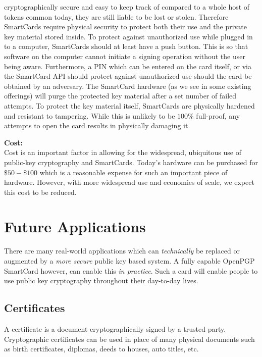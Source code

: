 \documentclass[11pt, twocolumn]{article}
\newenvironment{packed_desc}{
\begin{description}
  \setlength{\itemsep}{1pt}
  \setlength{\parskip}{0pt}
  \setlength{\parsep}{0pt}
}{\end{description}}
\begin{document}
\begin{packed_desc}
  cryptographically secure and easy to keep track of compared to a
  whole host of tokens common today, they are still liable to be lost
  or stolen. Therefore SmartCards require physical security to protect
  both their use and the private key material stored inside. To
  protect against unauthorized use while plugged in to a computer,
  SmartCards should at least have a push button. This is so that
  software on the computer cannot initiate a signing operation without
  the user being aware. Furthermore, a PIN which can be entered on the
  card itself, or via the SmartCard API should protect against
  unauthorized use should the card be obtained by an adversary. The
  SmartCard hardware (as we see in some existing offerings) will purge
  the protected key material after a set number of failed attempts. To
  protect the key material itself, SmartCards are physically hardened
  and resistant to tampering. While this is unlikely to be $100\%$
  full-proof, any attempts to open the card results in physically
  damaging it.
\item{\textbf{Cost:}} \\ \hfill Cost is an important factor in
  allowing for the widespread, ubiquitous use of public-key
  cryptography and SmartCards. Today's hardware can be purchased for
  $\$50 - \$100$ which is a reasonable expense for such an important
  piece of hardware. However, with more widespread use and economies
  of scale, we expect this cost to be reduced.
\end{packed_desc}

\section{Future Applications}
\label{sec:future}

There are many real-world applications which can \textit{technically} be
replaced or augmented by a \textit{more secure} public key based system. A fully
capable OpenPGP SmartCard however, can enable this \textit{in practice}. Such a
card will enable people to use public key cryptography throughout their
day-to-day lives.

\subsection{Certificates}

A certificate is a document cryptographically signed by a trusted party.
Cryptographic certificates can be used in place of many physical documents such
as birth certificates, diplomas, deeds to houses, auto titles, etc.
\end{document}

